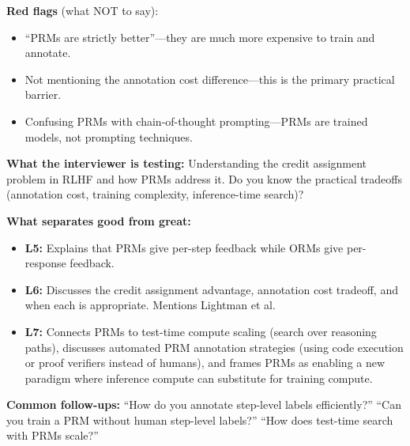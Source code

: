 \begin{interviewq}
\textbf{Red flags} (what NOT to say):
\begin{itemize}
    \item ``PRMs are strictly better''---they are much more expensive to train and annotate.
    \item Not mentioning the annotation cost difference---this is the primary practical barrier.
    \item Confusing PRMs with chain-of-thought prompting---PRMs are trained models, not prompting techniques.
\end{itemize}

\textbf{What the interviewer is testing:} Understanding the credit assignment problem in RLHF and how PRMs address it. Do you know the practical tradeoffs (annotation cost, training complexity, inference-time search)?

\textbf{What separates good from great:}
\begin{itemize}
    \item \textbf{L5:} Explains that PRMs give per-step feedback while ORMs give per-response feedback.
    \item \textbf{L6:} Discusses the credit assignment advantage, annotation cost tradeoff, and when each is appropriate. Mentions Lightman et al.
    \item \textbf{L7:} Connects PRMs to test-time compute scaling (search over reasoning paths), discusses automated PRM annotation strategies (using code execution or proof verifiers instead of humans), and frames PRMs as enabling a new paradigm where inference compute can substitute for training compute.
\end{itemize}

\textbf{Common follow-ups:} ``How do you annotate step-level labels efficiently?'' ``Can you train a PRM without human step-level labels?'' ``How does test-time search with PRMs scale?''
\end{interviewq}
